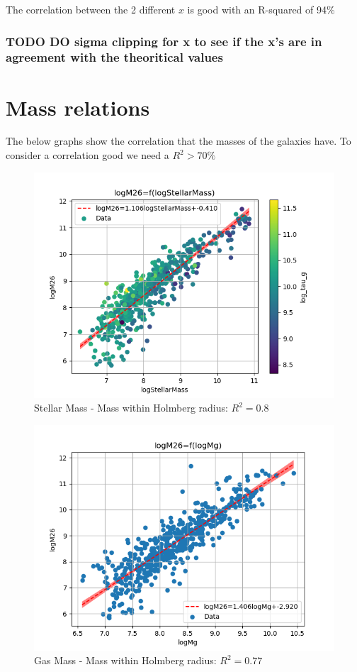 \documentclass[a4paper]{article}
\begin{document}
The correlation between the 2 different \(x\) is good with an R-squared of 94\%

\subsubsection{{\bfseries\sffamily TODO} DO sigma clipping for x to see if the x's are in agreement with the theoritical values}
\label{sec:org0b0321d}

\section{Mass relations}
\label{sec:org70c9aab}

The below graphs show the correlation that the masses of the galaxies have. To consider a correlation good we need a \(R^2>70\%\)


\begin{figure}[htbp]
\centering
\includegraphics[width=.9\linewidth]{./graphs/logStellarMass-logM26.png}
\caption{\label{Stellar Mass - Mass within Holmberg radius}Stellar Mass - Mass within Holmberg radius: \(R^2=0.8\)}
\end{figure}


\begin{figure}[htbp]
\centering
\includegraphics[width=.9\linewidth]{./graphs/logMg-logM26.png}
\caption{\label{Gas Mass - Mass within Holmberg radius}Gas Mass - Mass within Holmberg radius: \(R^2=0.77\)}
\end{figure}
\end{document}
